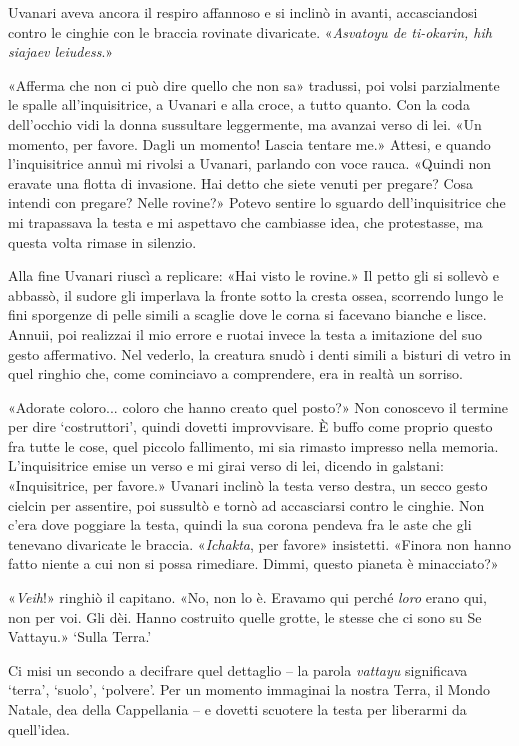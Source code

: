 Uvanari aveva ancora il respiro affannoso e si inclinò in avanti,
accasciandosi contro le cinghie con le braccia rovinate divaricate.
«\emph{Asvatoyu de ti-okarin, hih siajaev leiudess}.»

«Afferma che non ci può dire quello che non sa» tradussi, poi volsi
parzialmente le spalle all'inquisitrice, a Uvanari e alla croce, a tutto
quanto. Con la coda dell'occhio vidi la donna sussultare leggermente, ma
avanzai verso di lei. «Un momento, per favore. Dagli un momento! Lascia
tentare me.» Attesi, e quando l'inquisitrice annuì mi rivolsi a Uvanari,
parlando con voce rauca. «Quindi non eravate una flotta di invasione.
Hai detto che siete venuti per pregare? Cosa intendi con pregare? Nelle
rovine?» Potevo sentire lo sguardo dell'inquisitrice che mi trapassava
la testa e mi aspettavo che cambiasse idea, che protestasse, ma questa
volta rimase in silenzio.

Alla fine Uvanari riuscì a replicare: «Hai visto le rovine.» Il petto
gli si sollevò e abbassò, il sudore gli imperlava la fronte sotto la
cresta ossea, scorrendo lungo le fini sporgenze di pelle simili a
scaglie dove le corna si facevano bianche e lisce. Annuii, poi realizzai
il mio errore e ruotai invece la testa a imitazione del suo gesto
affermativo. Nel vederlo, la creatura snudò i denti simili a bisturi di
vetro in quel ringhio che, come cominciavo a comprendere, era in realtà
un sorriso.

«Adorate coloro... coloro che hanno creato quel posto?» Non conoscevo il
termine per dire `costruttori', quindi dovetti improvvisare. È buffo
come proprio questo fra tutte le cose, quel piccolo fallimento, mi sia
rimasto impresso nella memoria. L'inquisitrice emise un verso e mi girai
verso di lei, dicendo in galstani: «Inquisitrice, per favore.» Uvanari
inclinò la testa verso destra, un secco gesto cielcin per assentire, poi
sussultò e tornò ad accasciarsi contro le cinghie. Non c'era dove
poggiare la testa, quindi la sua corona pendeva fra le aste che gli
tenevano divaricate le braccia. «\emph{Ichakta}, per favore» insistetti.
«Finora non hanno fatto niente a cui non si possa rimediare. Dimmi,
questo pianeta è minacciato?»

«\emph{Veih}!» ringhiò il capitano. «No, non lo è. Eravamo qui perché
\emph{loro} erano qui, non per voi. Gli dèi. Hanno costruito quelle
grotte, le stesse che ci sono su Se Vattayu.» `Sulla Terra.'

Ci misi un secondo a decifrare quel dettaglio -- la parola
\emph{vattayu} significava `terra', `suolo', `polvere'. Per un momento
immaginai la nostra Terra, il Mondo Natale, dea della Cappellania -- e
dovetti scuotere la testa per liberarmi da quell'idea.

